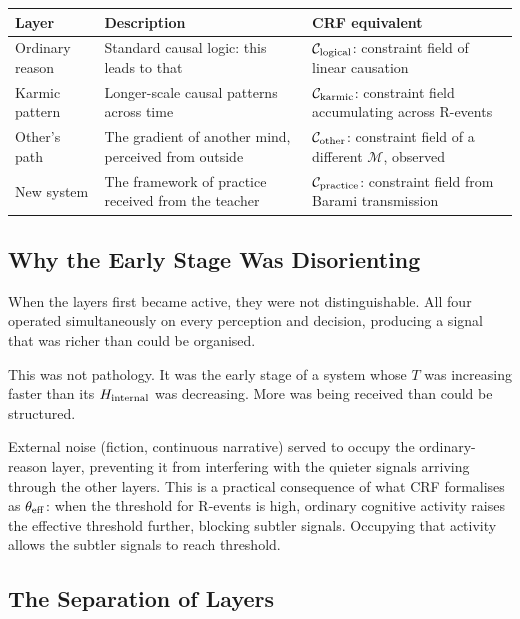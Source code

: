 \documentclass[12pt, a4paper]{article}
\begin{document}
\begin{center}
\renewcommand{\arraystretch}{1.5}
\begin{tabular}{p{2cm} p{4.5cm} p{5cm}}
\toprule
\textbf{Layer} & \textbf{Description} & \textbf{CRF equivalent} \\
\midrule
Ordinary reason & Standard causal logic: this leads to that & $\mathcal{C}_{\rm logical}$: constraint field of linear causation \\
Karmic pattern & Longer-scale causal patterns across time & $\mathcal{C}_{\rm karmic}$: constraint field accumulating across R-events \\
Other's path & The gradient of another mind, perceived from outside & $\mathcal{C}_{\rm other}$: constraint field of a different $\mathcal{M}$, observed \\
New system & The framework of practice received from the teacher & $\mathcal{C}_{\rm practice}$: constraint field from Barami transmission \\
\bottomrule
\end{tabular}
\end{center}

\subsection{Why the Early Stage Was Disorienting}

When the layers first became active, they were not distinguishable.
All four operated simultaneously on every perception and decision,
producing a signal that was richer than could be organised.

This was not pathology. It was the early stage of a system whose $T$
was increasing faster than its $H_{\rm internal}$ was decreasing.
More was being received than could be structured.

External noise (fiction, continuous narrative) served to occupy the
ordinary-reason layer, preventing it from interfering with the quieter
signals arriving through the other layers. This is a practical consequence
of what CRF formalises as $\theta_{\rm eff}$: when the threshold for
R-events is high, ordinary cognitive activity raises the effective threshold
further, blocking subtler signals. Occupying that activity allows the subtler
signals to reach threshold.

\subsection{The Separation of Layers}
\end{document}
